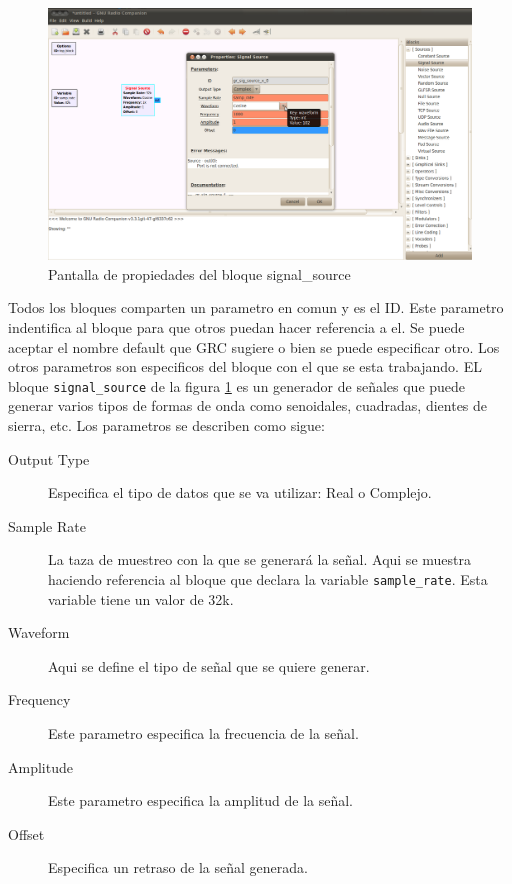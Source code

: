 \begin{figure}[tp]
  \centering
  \includegraphics[width=5.5in]{figs/grc3}
  \vspace{0.3in}
  \caption{Pantalla de propiedades del bloque signal\_source}
  \label{fig:blockprop}
\end{figure}

Todos los bloques comparten un parametro en comun y es el ID. Este parametro indentifica al bloque
para que otros puedan hacer referencia a el. Se puede aceptar el nombre default que GRC sugiere o
bien se puede especificar otro. Los otros parametros son especificos del bloque con el que se esta
trabajando. EL bloque \verb|signal_source| de la figura \ref{fig:blockprop} es un generador de
se\~nales que puede generar varios tipos de formas de onda como senoidales, cuadradas, dientes de
sierra, etc. Los parametros se describen como sigue:

\begin{description}
\item[Output Type] Especifica el tipo de datos que se va utilizar: Real o Complejo.
\item[Sample Rate] La taza de muestreo con la que se generar\'a la se\~nal. Aqui se muestra haciendo
referencia al bloque que declara la variable \verb|sample_rate|. Esta variable tiene un valor de
32k.
\item[Waveform] Aqui se define el tipo de se\~nal que se quiere generar.
\item[Frequency] Este parametro especifica la frecuencia de la se\~nal.
\item[Amplitude] Este parametro especifica la amplitud de la se\~nal.
\item[Offset] Especifica un retraso de la se\~nal generada.
\end{description}

